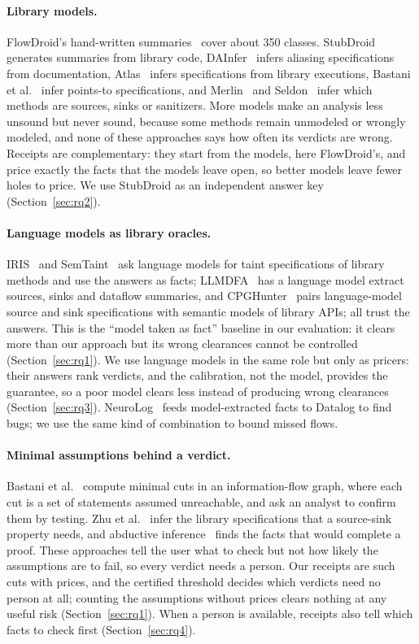 \paragraph{Library models.}
FlowDroid's hand-written summaries~\cite{flowdroid} cover about 350 classes.
StubDroid~\cite{stubdroid} generates summaries from library code, DAInfer~\cite{dainfer} infers aliasing specifications from documentation, Atlas~\cite{atlas} infers specifications from library executions, Bastani et al.~\cite{bastani-popl15} infer points-to specifications, and Merlin~\cite{merlin} and Seldon~\cite{seldon} infer which methods are sources, sinks or sanitizers.
More models make an analysis less unsound but never sound, because some methods remain unmodeled or wrongly modeled, and none of these approaches says how often its verdicts are wrong.
Receipts are complementary: they start from the models, here FlowDroid's, and price exactly the facts that the models leave open, so better models leave fewer holes to price.
We use StubDroid as an independent answer key (Section~\ref{sec:rq2}).

\paragraph{Language models as library oracles.}
IRIS~\cite{iris} and SemTaint~\cite{semtaint} ask language models for taint specifications of library methods and use the answers as facts; LLMDFA~\cite{llmdfa} has a language model extract sources, sinks and dataflow summaries, and CPGHunter~\cite{cpghunter} pairs language-model source and sink specifications with semantic models of library APIs; all trust the answers.
This is the ``model taken as fact'' baseline in our evaluation: it clears more than our approach but its wrong clearances cannot be controlled (Section~\ref{sec:rq1}).
We use language models in the same role but only as pricers: their answers rank verdicts, and the calibration, not the model, provides the guarantee, so a poor model clears less instead of producing wrong clearances (Section~\ref{sec:rq3}).
NeuroLog~\cite{neurolog} feeds model-extracted facts to Datalog to find bugs; we use the same kind of combination to bound missed flows.

\paragraph{Minimal assumptions behind a verdict.}
Bastani et al.~\cite{bastani-oopsla15} compute minimal cuts in an information-flow graph, where each cut is a set of statements assumed unreachable, and ask an analyst to confirm them by testing.
Zhu et al.~\cite{zhu-aplas13} infer the library specifications that a source-sink property needs, and abductive inference~\cite{dillig-pldi12,elrond} finds the facts that would complete a proof.
These approaches tell the user what to check but not how likely the assumptions are to fail, so every verdict needs a person.
Our receipts are such cuts with prices, and the certified threshold decides which verdicts need no person at all; counting the assumptions without prices clears nothing at any useful risk (Section~\ref{sec:rq1}).
When a person is available, receipts also tell which facts to check first (Section~\ref{sec:rq4}).

